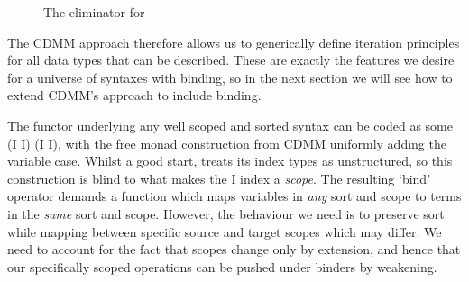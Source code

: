 \begin{figure}
\caption{The eliminator for \label{fig:listfold}}
\end{figure}

The CDMM approach therefore allows us to generically define iteration principles
for all data types that can be described. These are exactly the features we desire
for a universe of syntaxes with binding, so in the next section we will see how
to extend CDMM's approach to include binding.

The functor underlying any well scoped and sorted syntax can be coded as some
{ (I \AR{$\times$}  I) (I \AR{$\times$}  I)}, with the
free monad construction from CDMM uniformly adding the variable case. Whilst a
good start,  treats its index types as unstructured, so this construction
is blind to what makes the { I} index a \emph{scope}. The resulting
`bind' operator demands a function which maps variables in \emph{any} sort and
scope to terms in the \emph{same} sort and scope. However, the behaviour we need
is to preserve sort while mapping between specific source and target scopes which
may differ. We need to account for the fact that scopes change only by extension,
and hence that our specifically scoped operations can be pushed under binders by
weakening.
